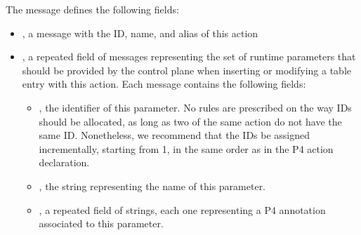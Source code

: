 \documentclass[11pt]{article}
\begin{document}
{%
The  message defines the following fields:%

\begin{itemize}%

\item{}
, a  message with the ID, name, and alias of this action%

\item{}
, a repeated field of  messages representing the set of runtime
parameters that should be provided by the control plane when inserting or
modifying a table entry with this action. Each  message contains the
following fields:%

\begin{itemize}[noitemsep,topsep=\mdcompacttopsep]%

\item{}, the  identifier of this parameter. No rules are prescribed
on the way  IDs should be allocated, as long as two  of the
same action do not have the same ID. Nonetheless, we recommend that the
IDs be assigned incrementally, starting from 1, in the same order as in
the P4 action declaration.%

\item{}, the string representing the name of this parameter.%

\item{}, a repeated field of strings, each one representing a P4
annotation associated to this parameter.%


\end{itemize}
\end{itemize}}
\end{document}
